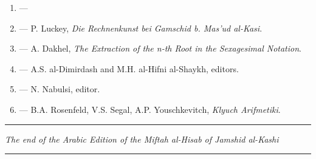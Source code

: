 \documentclass[11pt,a4paper]{book}
\newcommand{\shortline}{\noindent\rule{0.5\textwidth}{0.4pt}\par}
\begin{document}
\begin{enumerate}[label=\arabic*.]
  \item \textbf{} — 
  \item \textbf{} — P. Luckey, \textit{Die Rechnenkunst bei Gamschid b. Mas'ud al-Kasi}.
  \item \textbf{} — A. Dakhel, \textit{The Extraction of the n-th Root in the Sexagesimal Notation}.
  \item \textbf{} — A.S. al-Dimirdash and M.H. al-Hifni al-Shaykh, editors.
  \item \textbf{} — N. Nabulsi, editor.
  \item \textbf{} — B.A. Rosenfeld, V.S. Segal, A.P. Youschkevitch, \textit{Klyuch Arifmetiki}.
\end{enumerate}

\vspace{0.5cm}

\begin{center}
\shortline

\vspace{0.5cm}

\textit{The end of the Arabic Edition of the \textit{Miftah al-Hisab} of Jamshid al-Kashi}

\vspace{0.3cm}


\vspace{0.3cm}


\vspace{0.5cm}

\shortline
\end{center}
\end{document}
